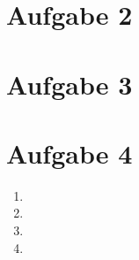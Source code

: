 \documentclass[a4paper,10pt]{article}
\begin{document}
\section*{Aufgabe 2}
\section*{Aufgabe 3}
\section*{Aufgabe 4}
    \begin{enumerate}[~~a.)]
        \item
        \item
        \item
        \item
    \end{enumerate}
\end{document}
